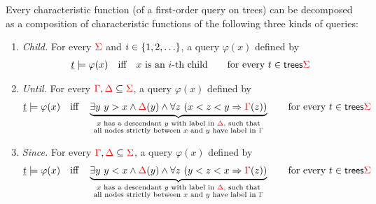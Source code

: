 \begin{lemma}\label{lem:schlingloff} Every characteristic function (of a first-order query on trees) can be decomposed as a composition of characteristic functions of the following three kinds of  queries:
    \begin{enumerate}
        \item \emph{Child.} For every ${\color{red}{\Sigma}}$ and  $i \in \{1,2,\ldots\}$, a query $\varphi(x)$ defined by
        \begin{align*}
            \underline t \models \varphi(x) \quad \text{iff} \quad \text{$x$ is an $i$-th child}\qquad \text{for every $t \in \mathsf {trees} {\color{red}{\Sigma}}$}
        \end{align*}
         \item \emph{Until.} For every ${\color{red}{\Gamma}}, {\color{red}{\Delta}} \subseteq {\color{red}{\Sigma}}$, a query $\varphi(x)$ defined by
         \begin{align*}
             \underline t \models \varphi(x) \quad \text{iff} \quad \underbrace{\exists y\ y > x \land {\color{red}{\Delta}}(y) \land  \forall z \ (x < z < y \Rightarrow {\color{red}{\Gamma}}(z))}_{\substack{\text{$x$ has a descendant $y$ with label in ${\color{red}{\Delta}}$, such that}\\ \text{all nodes strictly between $x$ and $y$ have label in ${\color{red}{\Gamma}}$}}}  \qquad \text{for every $t \in  \mathsf {trees} {\color{red}{\Sigma}}$}
         \end{align*} 
         \item \emph{Since.} For every ${\color{red}{\Gamma}}, {\color{red}{\Delta}} \subseteq {\color{red}{\Sigma}}$,  a query $\varphi(x)$ defined by
         \begin{align*}
             \underline t \models \varphi(x) \quad \text{iff} \quad \underbrace{\exists y\ y < x \land {\color{red}{\Delta}}(y) \land  \forall z \ (y < z < x \Rightarrow {\color{red}{\Gamma}}(z))}_{\substack{\text{$x$ has a descendant $y$ with label in ${\color{red}{\Delta}}$, such that}\\ \text{all nodes strictly between $x$ and $y$ have label in ${\color{red}{\Gamma}}$}}}  \qquad \text{for every $t \in  \mathsf {trees} {\color{red}{\Sigma}}$}
         \end{align*} 
    \end{enumerate}
\end{lemma}

